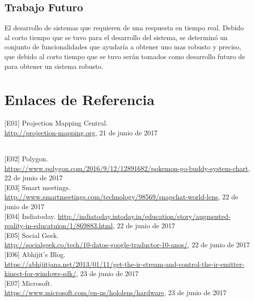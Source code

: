 \documentclass[a4paper,openright,12pt]{report}
\begin{document}
\section{Trabajo Futuro}
El desarrollo de sistemas que requieren de una respuesta en tiempo real.
Debido al corto tiempo que se tuvo para el desarrollo del sistema,  se determinó un conjunto de funcionalidades que ayudaría a obtener uno mas robusto y preciso, que debido al corto tiempo que se tuvo serán tomados como desarrollo futuro de para obtener un sistema robusto.

\cleardoublepage
{}


\chapter*{Enlaces de Referencia}
\hypertarget{e01}{
[E01] Projection Mapping Central. \\\url{http://projection-mapping.org}, 21 de junio de 2017}\\

\hypertarget{e02}{[E02] Polygon. \\\url{https://www.polygon.com/2016/9/12/12891682/pokemon-go-buddy-system-chart}, 22 de junio de 2017}\\

\hypertarget{e03}{[E03] Smart meetings. \url{http://www.smartmeetings.com/technology/98569/snapchat-world-lens}, 22 de junio de 2017}\\

\hypertarget{e04}{[E04] Indiatoday. \url{http://indiatoday.intoday.in/education/story/augmented-reality-in-educatuion/1/869883.html}, 22 de junio de 2017}\\

\hypertarget{e05}{[E05] Social Geek.\\ \url{http://socialgeek.co/tech/10-datos-google-traductor-10-anos/}, 22 de junio de 2017}\\

\hypertarget{e06}{[E06] Abhijit's Blog.\\ \url{https://abhijitjana.net/2013/01/11/get-the-ir-stream-and-control-the-ir-emitter-kinect-for-windows-sdk/}, 23 de junio de 2017}\\

\hypertarget{e07}{[E07] Microsoft.\\ \url{https://www.microsoft.com/en-us/hololens/hardware}, 23 de junio de 2017}\\
\end{document}
